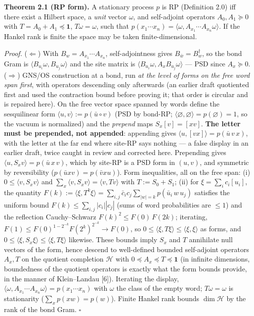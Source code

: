 \documentclass[11pt]{article}
\begin{document}
\textbf{Theorem 2.1 (RP form).}  A stationary process $p$ is RP (Definition 2.0) iff there exist a Hilbert space, a \emph{unit} vector $\omega$, and self-adjoint operators $A_0, A_1 \succeq 0$ with $T = A_0 + A_1 \preceq \mathbf 1$, $T\omega = \omega$, such that $p(x_1\cdots x_n) = \langle\omega, A_{x_1}\cdots A_{x_n}\omega\rangle$. If the Hankel rank is finite the space may be taken finite-dimensional.

\emph{Proof.}  ($\Leftarrow$)  With $B_w = A_{x_1}\cdots A_{x_n}$, self-adjointness gives $B_{\bar w} = B_w^{\dagger}$, so the bond Gram is $\langle B_{u_i}\omega, B_{u_j}\omega\rangle$ and the site matrix is $\langle B_{u_i}\omega, A_x B_{u_j}\omega\rangle$ — PSD since $A_x \succeq 0$.  ($\Rightarrow$)  GNS/OS construction at a bond, run \emph{at the level of forms on the free word span first}, with operators descending only afterwards (an earlier draft quotiented first and used the contraction bound before proving it; that order is circular and is repaired here).  On the free vector space spanned by words define the sesquilinear form $\langle u, v\rangle := p(\bar u \circ v)$ (PSD by bond-RP; $\langle\varnothing,\varnothing\rangle = p(\varnothing) = 1$, so the vacuum is normalized) and the \emph{prepend} maps $S_x[v] = [x v]$.  \textbf{The letter must be prepended, not appended}: appending gives $\langle u, [v x]\rangle = p(\bar u\, v\, x)$, with the letter at the far end where site-RP says nothing — a false display in an earlier draft, twice caught in review and corrected here.  Prepending gives $\langle u, S_x v\rangle = p(\bar u\, x\, v)$, which by site-RP is a PSD form in $(u, v)$, and symmetric by reversibility ($p(\bar u x v) = p(\bar v x u)$).  Form inequalities, all on the free span: (i) $0 \le \langle v, S_x v\rangle$ and $\sum_x \langle v, S_x v\rangle = \langle v, T v\rangle$ with $T := S_0 + S_1$; (ii) for $\xi = \sum_i c_i [u_i]$, the quantity $F(k) := \langle\xi, T^k\xi\rangle = \sum_{i,j}\bar c_i c_j \sum_{|w| = k} p(\bar u_i\, w\, u_j)$ satisfies the uniform bound $F(k) \le \sum_{i,j}|c_i||c_j|$ (sums of word probabilities are $\le 1$) and the reflection Cauchy–Schwarz $F(k)^2 \le F(0)\,F(2k)$; iterating, $F(1) \le F(0)^{1 - 2^{-k}} F(2^k)^{2^{-k}} \to F(0)$, so $0 \le \langle\xi, T\xi\rangle \le \langle\xi, \xi\rangle$ as forms, and $0 \le \langle\xi, S_x\xi \rangle \le \langle\xi, T\xi\rangle$ likewise.  These bounds imply $S_x$ and $T$ annihilate null vectors of the form, hence descend to well-defined bounded self-adjoint operators $A_x, T$ on the quotient completion $\mathcal H$ with $0 \preceq A_x \preceq T \preceq \mathbf 1$ (in infinite dimensions, boundedness of the quotient operators is exactly what the form bounds provide, in the manner of Klein–Landau [6]).  Iterating the display, $\langle\omega, A_{x_1}\cdots A_{x_n}\omega\rangle = p(x_1\cdots x_n)$ with $\omega$ the class of the empty word; $T\omega = \omega$ is stationarity ($\sum_x p(xw) = p(w)$).  Finite Hankel rank bounds $\dim\mathcal H$ by the rank of the bond Gram. $\square$
\end{document}
